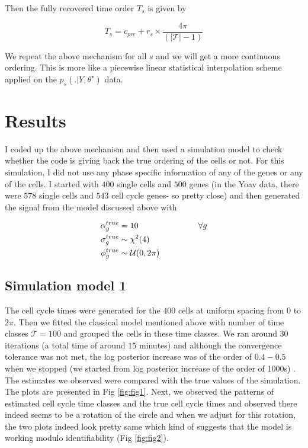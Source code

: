 \documentclass[11pt]{article}
\begin{document}
Then the fully recovered time order $T_s$ is given by 

$$ T_s = c_{pre} + r_s \times  \frac{4 \pi}{(| \mathcal{T} | -1 )} $$

We repeat the above mechanism for all $s$ and we will get a more continuous ordering. This is more like a piecewise linear statistical interpolation scheme applied on the $p_s \left (. | Y, \theta^{\star} \right )$ data. 


\section{Results}

I coded up the above mechanism and then used a simulation model to check whether the code is giving back the true ordering of the cells or not. For this simulation, I did not use any phase specific information of any of the genes or any of the cells. I started with $400$ single cells and $500$ genes (in the Yoav data, there were $578$ single cells and $543$ cell cycle genes- so pretty close) and then generated the signal from the model discussed above with 

\begin{align*}
 \alpha^{true}_{g}  & =10 \hspace{1 in} \forall g  \\
 \sigma^{true}_{g} &  \sim \chi^{2} (4)  \\
 \phi^{true}_{g}  & \sim \mathcal{U}(0, 2 \pi)   \\
 \end{align*}
 
 \subsection{Simulation model 1}

The cell cycle times were generated for the $400$ cells at uniform spacing from $0$ to $2 \pi$. Then we fitted the classical model mentioned above with number of time classes $\mathcal{T} =100$ and grouped the cells in these time classes. We ran around $30$ iterations (a total time of around $15$ minutes) and although the convergence tolerance was not met, the log posterior increase was of the order of $0.4-0.5$ when we stopped (we started from log posterior increase of the order of 1000s) . The estimates we observed were compared with the true values of the simulation. The plots are presented in Fig \ref{fig:fig1}. Next, we observed the patterns of estimated cell cycle time classes and the true cell cycle times and observed there indeed seems to be a rotation of the circle and when we adjust for this rotation, the two plots indeed look pretty same which kind of suggests that the model is working modulo identifiability (Fig \ref{fig:fig2}).
\end{document}
